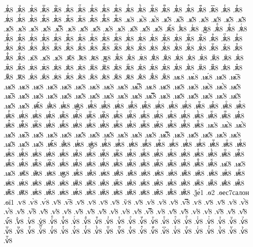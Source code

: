 {.ѫ҅ⷯ8
.ѫ҅ⷰ8
.ѫ҅ⷱ8
.ѫ҅ⷲ8
.ѫ҅ⷳ8
.ѫ҅ⷴ8
.ѫ҅ⷵ8
.ѫ҅ⷶ8
.ѫ҅ⷷ8
.ѫ҅ⷸ8
.ѫ҅ⷹ8
.ѫ҅ⷺ8
.ѫ҅ⷻ8
.ѫ҅ⷼ8
.ѫ҅ⷽ8
.ѫ҅ⷾ8
.ѫ҅ⷿ8
.ѫ҅꙯8
.ѫ҅ꙴ8
.ѫ҅ꙵ8
.ѫ҅ꙶ8
.ѫ҅ꙷ8
.ѫ҅ꙸ8
.ѫ҅ꙹ8
.ѫ҅ꙺ8
.ѫ҅ꙻ8
.ѫ҅꙼8
.ѫ҅꙽8
.ѫ҅ꚞ8
.ѫ҅ꚟ8
.ѫ҆8
.ѫ҆̀8
.ѫ҆́8
.ѫ҆̂8
.ѫ҆̅8
.ѫ҆̆8
.ѫ҆̇8
.ѫ҆̈8
.ѫ҆̋8
.ѫ҆̏8
.ѫ҆̑8
.ѫ҆̓8
.ѫ҆̔8
.ѫ҆̾8
.ѫ҆̿8
.ѫ҆͘8
.ѫ҆҃8
.ѫ҆҄8
.ѫ҆҅8
.ѫ҆҆8
.ѫ҆҇8
.ѫ҆᷀8
.ѫ҆᷁8
.ѫ҆᷶8
.ѫ᷷҆8
.ѫ᷸҆8
.ѫ᷹҆8
.ѫ҆ⷠ8
.ѫ҆ⷡ8
.ѫ҆ⷢ8
.ѫ҆ⷣ8
.ѫ҆ⷤ8
.ѫ҆ⷥ8
.ѫ҆ⷦ8
.ѫ҆ⷧ8
.ѫ҆ⷨ8
.ѫ҆ⷩ8
.ѫ҆ⷪ8
.ѫ҆ⷫ8
.ѫ҆ⷬ8
.ѫ҆ⷭ8
.ѫ҆ⷮ8
.ѫ҆ⷯ8
.ѫ҆ⷰ8
.ѫ҆ⷱ8
.ѫ҆ⷲ8
.ѫ҆ⷳ8
.ѫ҆ⷴ8
.ѫ҆ⷵ8
.ѫ҆ⷶ8
.ѫ҆ⷷ8
.ѫ҆ⷸ8
.ѫ҆ⷹ8
.ѫ҆ⷺ8
.ѫ҆ⷻ8
.ѫ҆ⷼ8
.ѫ҆ⷽ8
.ѫ҆ⷾ8
.ѫ҆ⷿ8
.ѫ҆꙯8
.ѫ҆ꙴ8
.ѫ҆ꙵ8
.ѫ҆ꙶ8
.ѫ҆ꙷ8
.ѫ҆ꙸ8
.ѫ҆ꙹ8
.ѫ҆ꙺ8
.ѫ҆ꙻ8
.ѫ҆꙼8
.ѫ҆꙽8
.ѫ҆ꚞ8
.ѫ҆ꚟ8
.ѫ҇8
.ѫ᷀8
.ѫ᷁8
.ѫ᷶8
.ѫ᷷8
.ѫ᷸8
.ѫ᷹8
.ѫⷠ8
.ѫⷡ8
.ѫⷢ8
.ѫⷣ8
.ѫⷤ8
.ѫⷥ8
.ѫⷦ8
.ѫⷧ8
.ѫⷨ8
.ѫⷩ8
.ѫⷪ8
.ѫⷫ8
.ѫⷬ8
.ѫⷭ8
.ѫⷮ8
.ѫⷯ8
.ѫⷰ8
.ѫⷱ8
.ѫⷲ8
.ѫⷳ8
.ѫⷴ8
.ѫⷵ8
.ѫⷶ8
.ѫⷷ8
.ѫⷸ8
.ѫⷹ8
.ѫⷺ8
.ѫⷻ8
.ѫⷼ8
.ѫⷽ8
.ѫⷾ8
.ѫⷿ8
.ѫ꙯8
.ѫꙴ8
.ѫꙵ8
.ѫꙶ8
.ѫꙷ8
.ѫꙸ8
.ѫꙹ8
.ѫꙺ8
.ѫꙻ8
.ѫ꙼8
.ѫ꙽8
.ѫꚞ8
.ѫꚟ8
.ѭ8
.ѭ̀8
.ѭ́8
.ѭ̂8
.ѭ̅8
.ѭ̆8
.ѭ̇8
.ѭ̈8
.ѭ̋8
.ѭ̏8
.ѭ̑8
.ѭ̓8
.ѭ̔8
.ѭ̾8
.ѭ̿8
.ѭ͘8
.ѭ҃8
.ѭ҄8
.ѭ҅8
.ѭ҅̀8
.ѭ҅́8
.ѭ҅̂8
.ѭ҅̅8
.ѭ҅̆8
.ѭ҅̇8
.ѭ҅̈8
.ѭ҅̋8
.ѭ҅̏8
.ѭ҅̑8
.ѭ҅̓8
.ѭ҅̔8
.ѭ҅̾8
.ѭ҅̿8
.ѭ҅͘8
.ѭ҅҃8
.ѭ҅҄8
.ѭ҅҅8
.ѭ҅҆8
.ѭ҅҇8
.ѭ҅᷀8
.ѭ҅᷁8
.ѭ҅᷶8
.ѭ᷷҅8
.ѭ᷸҅8
.ѭ᷹҅8
.ѭ҅ⷠ8
.ѭ҅ⷡ8
.ѭ҅ⷢ8
.ѭ҅ⷣ8
.ѭ҅ⷤ8
.ѭ҅ⷥ8
.ѭ҅ⷦ8
.ѭ҅ⷧ8
.ѭ҅ⷨ8
.ѭ҅ⷩ8
.ѭ҅ⷪ8
.ѭ҅ⷫ8
.ѭ҅ⷬ8
.ѭ҅ⷭ8
.ѭ҅ⷮ8
.ѭ҅ⷯ8
.ѭ҅ⷰ8
.ѭ҅ⷱ8
.ѭ҅ⷲ8
.ѭ҅ⷳ8
.ѭ҅ⷴ8
.ѭ҅ⷵ8
.ѭ҅ⷶ8
.ѭ҅ⷷ8
.ѭ҅ⷸ8
.ѭ҅ⷹ8
.ѭ҅ⷺ8
.ѭ҅ⷻ8
.ѭ҅ⷼ8
.ѭ҅ⷽ8
.ѭ҅ⷾ8
.ѭ҅ⷿ8
.ѭ҅꙯8
.ѭ҅ꙴ8
.ѭ҅ꙵ8
.ѭ҅ꙶ8
.ѭ҅ꙷ8
.ѭ҅ꙸ8
.ѭ҅ꙹ8
.ѭ҅ꙺ8
.ѭ҅ꙻ8
.ѭ҅꙼8
.ѭ҅꙽8
.ѭ҅ꚞ8
.ѭ҅ꚟ8
.ѭ҆8
.ѭ҆̀8
.ѭ҆́8
.ѭ҆̂8
.ѭ҆̅8
.ѭ҆̆8
.ѭ҆̇8
.ѭ҆̈8
.ѭ҆̋8
.ѭ҆̏8
.ѭ҆̑8
.ѭ҆̓8
.ѭ҆̔8
.ѭ҆̾8
.ѭ҆̿8
.ѭ҆͘8
.ѭ҆҃8
.ѭ҆҄8
.ѭ҆҅8
.ѭ҆҆8
.ѭ҆҇8
.ѭ҆᷀8
.ѭ҆᷁8
.ѭ҆᷶8
.ѭ᷷҆8
.ѭ᷸҆8
.ѭ᷹҆8
.ѭ҆ⷠ8
.ѭ҆ⷡ8
.ѭ҆ⷢ8
.ѭ҆ⷣ8
.ѭ҆ⷤ8
.ѭ҆ⷥ8
.ѭ҆ⷦ8
.ѭ҆ⷧ8
.ѭ҆ⷨ8
.ѭ҆ⷩ8
.ѭ҆ⷪ8
.ѭ҆ⷫ8
.ѭ҆ⷬ8
.ѭ҆ⷭ8
.ѭ҆ⷮ8
.ѭ҆ⷯ8
.ѭ҆ⷰ8
.ѭ҆ⷱ8
.ѭ҆ⷲ8
.ѭ҆ⷳ8
.ѭ҆ⷴ8
.ѭ҆ⷵ8
.ѭ҆ⷶ8
.ѭ҆ⷷ8
.ѭ҆ⷸ8
.ѭ҆ⷹ8
.ѭ҆ⷺ8
.ѭ҆ⷻ8
.ѭ҆ⷼ8
.ѭ҆ⷽ8
.ѭ҆ⷾ8
.ѭ҆ⷿ8
.ѭ҆꙯8
.ѭ҆ꙴ8
.ѭ҆ꙵ8
.ѭ҆ꙶ8
.ѭ҆ꙷ8
.ѭ҆ꙸ8
.ѭ҆ꙹ8
.ѭ҆ꙺ8
.ѭ҆ꙻ8
.ѭ҆꙼8
.ѭ҆꙽8
.ѭ҆ꚞ8
.ѭ҆ꚟ8
.ѭ҇8
.ѭ᷀8
.ѭ᷁8
.ѭ᷶8
.ѭ᷷8
.ѭ᷸8
.ѭ᷹8
.ѭⷠ8
.ѭⷡ8
.ѭⷢ8
.ѭⷣ8
.ѭⷤ8
.ѭⷥ8
.ѭⷦ8
.ѭⷧ8
.ѭⷨ8
.ѭⷩ8
.ѭⷪ8
.ѭⷫ8
.ѭⷬ8
.ѭⷭ8
.ѭⷮ8
.ѭⷯ8
.ѭⷰ8
.ѭⷱ8
.ѭⷲ8
.ѭⷳ8
.ѭⷴ8
.ѭⷵ8
.ѭⷶ8
.ѭⷷ8
.ѭⷸ8
.ѭⷹ8
.ѭⷺ8
.ѭⷻ8
.ѭⷼ8
.ѭⷽ8
.ѭⷾ8
.ѭⷿ8
.ѭ꙯8
.ѭꙴ8
.ѭꙵ8
.ѭꙶ8
.ѭꙷ8
.ѭꙸ8
.ѭꙹ8
.ѭꙺ8
.ѭꙻ8
.ѭ꙼8
.ѭ꙽8
.ѭꚞ8
.ѭꚟ8
.ѯе́1
.ѳ2
.ѳес7салон
.ѳї1
.ѵ8
.ѵ̀8
.ѵ́8
.ѵ̂8
.ѵ̅8
.ѵ̆8
.ѵ̇8
.ѵ̈8
.ѵ̋8
.ѷ8
.ѵ̑8
.ѵ̓8
.ѵ̔8
.ѵ̾8
.ѵ̿8
.ѵ͘8
.ѵ҃8
.ѵ҄8
.ѵ҅8
.ѵ҅̀8
.ѵ҅́8
.ѵ҅̂8
.ѵ҅̅8
.ѵ҅̆8
.ѵ҅̇8
.ѵ҅̈8
.ѵ҅̋8
.ѵ҅̏8
.ѵ҅̑8
.ѵ҅̓8
.ѵ҅̔8
.ѵ҅̾8
.ѵ҅̿8
.ѵ҅͘8
.ѵ҅҃8
.ѵ҅҄8
.ѵ҅҅8
.ѵ҅҆8
.ѵ҅҇8
.ѵ҅᷀8
.ѵ҅᷁8
.ѵ҅᷶8
.ѵ᷷҅8
.ѵ᷸҅8
.ѵ᷹҅8
.ѵ҅ⷠ8
.ѵ҅ⷡ8
.ѵ҅ⷢ8
.ѵ҅ⷣ8
.ѵ҅ⷤ8
.ѵ҅ⷥ8
.ѵ҅ⷦ8
.ѵ҅ⷧ8
.ѵ҅ⷨ8
.ѵ҅ⷩ8
.ѵ҅ⷪ8
.ѵ҅ⷫ8
.ѵ҅ⷬ8
.ѵ҅ⷭ8
.ѵ҅ⷮ8
.ѵ҅ⷯ8
.ѵ҅ⷰ8
.ѵ҅ⷱ8
.ѵ҅ⷲ8
.ѵ҅ⷳ8
.ѵ҅ⷴ8
.ѵ҅ⷵ8
.ѵ҅ⷶ8
.ѵ҅ⷷ8
.ѵ҅ⷸ8
.ѵ҅ⷹ8
.ѵ҅ⷺ8
.ѵ҅ⷻ8
.ѵ҅ⷼ8
.ѵ҅ⷽ8
.ѵ҅ⷾ8
.ѵ҅ⷿ8
.ѵ҅꙯8
.ѵ҅ꙴ8
.ѵ҅ꙵ8
.ѵ҅ꙶ8
.ѵ҅ꙷ8
.ѵ҅ꙸ8
.ѵ҅ꙹ8
.ѵ҅ꙺ8
.ѵ҅ꙻ8
}
